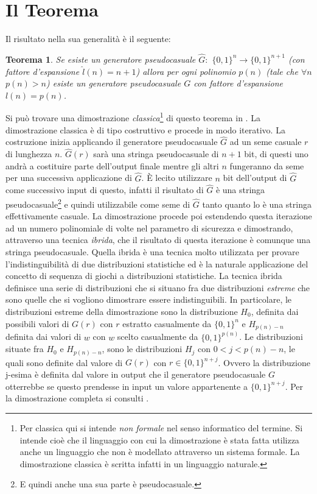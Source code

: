 \documentclass[a4paper,openright,twoside,12pt]{report}
\newtheorem{teorema}{Teorema}[chapter]
\begin{document}
\section{Il Teorema}
Il risultato nella sua generalit\`a \`e il seguente:
\begin{teorema}
Se esiste un generatore pseudocasuale $\hat{G}:$ $\{0, 1\}^n \rightarrow \{0, 1\}^{n+1}$ (con fattore 
d'espansione $\hat{l}(n)=n+1$) allora per ogni polinomio $p(n)$ (tale che $\forall n$ $p(n)>n$)
esiste un generatore pseudocasuale $G$ con fattore d'espansione $l(n)=p(n)$.
\end{teorema}

Si pu\`o trovare una dimostrazione \emph{classica}\footnote{Per classica qui si intende \emph{non formale} nel senso informatico del termine.
Si intende cio\`e che il linguaggio con cui la dimostrazione \`e stata fatta utilizza anche un linguaggio che non \`e modellato
attraverso un sistema formale. La dimostrazione classica \`e scritta infatti in un linguaggio naturale.} di questo teorema in \cite{1206501}. 
La dimostrazione classica \`e di tipo costruttivo e procede in modo iterativo.
La costruzione inizia applicando il generatore pseudocasuale $\hat{G}$ ad un seme casuale $r$ di lunghezza $n$. 
$\hat{G}(r)$ sar\`a una stringa pseudocasuale di $n+1$ bit, di questi uno andr\`a a costituire parte dell'output finale mentre gli altri 
$n$ fungeranno da seme per una successiva applicazione di $\hat{G}$. 
\`E lecito utilizzare $n$ bit dell'output di $\hat{G}$ come successivo input di questo, infatti il risultato di $\hat{G}$ \`e 
una stringa pseudocasuale\footnote{E quindi anche una sua parte \`e pseudocasuale.} e quindi utilizzabile come seme di $\hat{G}$ tanto quanto 
lo \`e una stringa effettivamente casuale.
La dimostrazione procede poi estendendo questa iterazione ad un numero polinomiale di volte nel parametro di sicurezza e dimostrando, attraverso una tecnica \emph{ibrida},
che il risultato di questa iterazione \`e comunque una stringa pseudocasuale. Quella ibrida \`e una tecnica molto utilizzata per provare l'indistinguibilit\`a di due distribuzioni statistiche ed \`e 
la naturale applicazione del concetto di sequenza di giochi a distribuzioni statistiche.
La tecnica ibrida definisce una serie di distribuzioni che si situano fra due distribuzioni \emph{estreme} che sono quelle che si vogliono dimostrare essere indistinguibili.
In particolare, le distribuzioni estreme della dimostrazione sono la distribuzione $H_0$, definita dai possibili valori di $G(r)$ con 
$r$ estratto casualmente da $\{0,1\}^n$ e $H_{p(n)-n}$ definita dai valori di $w$ con $w$ scelto casualmente da $\{0, 1\}^{p(n)}$. 
Le distribuzioni situate fra $H_0$ e $H_{p(n)-n}$, sono le distribuzioni $H_j$ con $0<j<p(n)-n$, le quali sono definite dal valore di 
$G(r)$ con $r \in \{0, 1\}^{n+j}$. Ovvero la distribuzione j-esima \`e definita dal valore in output che il generatore pseudocasuale $G$ otterrebbe
se questo prendesse in input un valore appartenente a $\{0, 1\}^{n+j}$. Per la dimostrazione completa si consulti \cite{1206501}.
\end{document}
